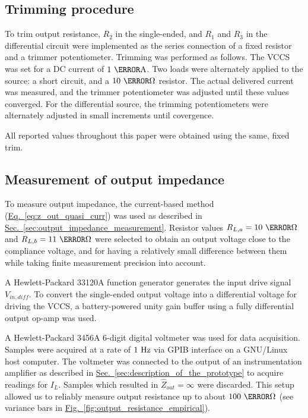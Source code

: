 \documentclass[10pt]{article}
\newcommand{\briefeqlink}[1]{\hyperref[#1]{Eq.~\ref*{#1}}\xspace }
\newcommand{\briefseclink}[1]{\hyperref[#1]{Sec.~\ref*{#1}}}
\newcommand{\brieffiglink}[1]{\hyperref[#1]{Fig.~\ref*{#1}}}
\begin{document}
\subsection{Trimming procedure}
\label{sec:trimming}

To trim output resistance, $R_2$ in the single-ended, and $R_1$ and $R_3$ in the differential circuit were implemented as the series connection of a fixed resistor and a trimmer potentiometer. Trimming was performed as follows. The VCCS was set for a DC current of $1~\milli\ampere$. Two loads were alternately applied to the source: a short circuit, and a $10~\kilo\ohm$ resistor. The actual delivered current was measured, and the trimmer potentiometer was adjusted until these values converged. For the differential source, the trimming potentiometers were alternately adjusted in small increments until covergence.

All reported values throughout this paper were obtained using the same, fixed trim.


\subsection{Measurement of output impedance}
\label{sec:empirical_output_resistance}

To measure output impedance, the current-based method (\briefeqlink{eq:z_out_quasi_curr}) was used as described in \briefseclink{sec:output_impedance_measurement}. Resistor values $R_{L,a}=10~\kilo\ohm$ and $R_{L,b}=11~\kilo\ohm$ were selected to obtain an output voltage close to the compliance voltage, and for having a relatively small difference between them while taking finite measurement precision into account. 

A Hewlett-Packard 33120A function generator generates the input drive signal $V_{in,diff}$. To convert the single-ended output voltage into a differential voltage for driving the VCCS, a battery-powered unity gain buffer using a fully differential output op-amp was used.

A Hewlett-Packard 3456A 6-digit digital voltmeter was used for data acquisition. Samples were acquired at a rate of $1~\hertz$ via GPIB interface on a GNU/Linux host computer. The voltmeter was connected to the output of an instrumentation amplifier as described in \briefseclink{sec:description_of_the_prototype} to acquire readings for $I_L$. Samples which resulted in $\hat{Z}_{out}=\infty$ were discarded. This setup allowed us to reliably measure output resistance up to about $100~\mega\ohm$ (see variance bars in \brieffiglink{fig:output_resistance_empirical}).
\end{document}
